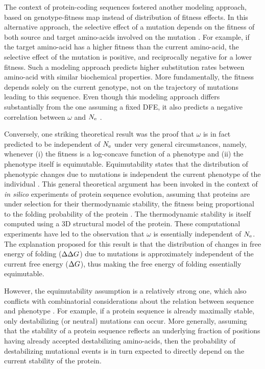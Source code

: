 \documentclass{MBE}%
\begin{document}
The context of protein-coding sequences fostered another modeling approach, based on genotype-fitness map instead of distribution of fitness effects.
In this alternative approach, the selective effect of a mutation depends on the fitness of both source and target amino-acids involved on the mutation \citep{Halpern1998, Rodrigue2010, Tamuri2012}.
For example, if the target amino-acid has a higher fitness than the current amino-acid, the selective effect of the mutation is positive, and reciprocally negative for a lower fitness.
Such a modeling approach predicts higher substitution rates between amino-acid with similar biochemical properties.
More fundamentally, the fitness depends solely on the current genotype, not on the trajectory of mutations leading to this sequence.
Even though this modeling approach differs substantially from the one assuming a fixed DFE, it also predicts a negative correlation between $\omega$ and $N_{\mathrm{e}}$ \citep{Spielman2015a, DosReis2015}.

Conversely, one striking theoretical result was the proof that $\omega$ is in fact predicted to be independent of $N_{\mathrm{e}}$ under very general circumstances, namely, whenever (i) the fitness is a log-concave function of a phenotype and (ii) the phenotype itself is equimutable.
Equimutability states that the distribution of phenotypic changes due to mutations is independent the current phenotype of the individual \citep{Cherry1998}.
This general theoretical argument has been invoked in the context of \textit{in silico} experiments of protein sequence evolution, assuming that proteins are under selection for their thermodynamic stability, the fitness being proportional to the folding probability of the protein \citep{Goldstein2013}.
The thermodynamic stability is itself computed using a 3D structural model of the protein. These computational experiments have led to the observation that $\omega$ is essentially independent of $N_{\mathrm{e}}$.
The explanation proposed for this result is that the distribution of changes in free energy of folding ($\Delta \Delta G$) due to mutations is approximately independent of the current free energy ($\Delta G$), thus making the free energy of folding essentially equimutable.

However, the equimutability assumption is a relatively strong one, which also conflicts with combinatorial considerations about the relation between sequence and phenotype \citep{Serohijos2012}.
For example, if a protein sequence is already maximally stable, only destabilizing (or neutral) mutations can occur.
More generally, assuming that the stability of a protein sequence reflects an underlying fraction of positions having already accepted destabilizing amino-acids, then the probability of destabilizing mutational events is in turn expected to directly depend on the current stability of the protein.
\end{document}
